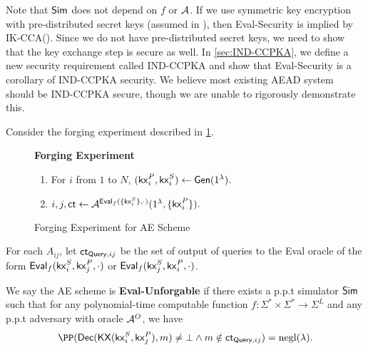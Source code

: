 Note that $\mathsf{Sim}$ does not depend on $f$ or $\mathcal{A}$. If we use symmetric key encryption with pre-distributed secret keys (assumed in \cite{angel2016unobservable}), then Eval-Security is implied by IK-CCA(\cite[Definition 1]{BBDP01keyprivate}). Since we do not have pre-distributed secret keys, we need to show that the key exchange step is secure as well. In \cref{sec:IND-CCPKA}, we define a new security requirement called IND-CCPKA  and show that Eval-Security is a corollary of IND-CCPKA security. We believe most existing AEAD system should be IND-CCPKA secure, though we are unable to rigorously demonstrate this.

\begin{definition}
\label{defn:AE-unforgability}
Consider the forging experiment described in \cref{expr:AE-forging}.

\begin{figure}[h!]
\begin{framed}
\textbf{Forging Experiment}
\begin{enumerate}
    \item For $i$ from $1$ to $N$, $(\mathsf{kx}_i^P, \mathsf{kx}_i^S) \leftarrow \mathsf{Gen}(1^{\lambda}).$
    \item $i, j, \mathsf{ct} \leftarrow \mathcal{A}^{\mathsf{Eval}_f(\{\mathsf{kx}_i^S\}, \cdot)}(1^{\lambda}, \{\mathsf{kx}_i^P\}).$
\end{enumerate}
\end{framed}
\caption{Forging Experiment for AE Scheme}
\label{expr:AE-forging}
\end{figure}

For each $A_{ij}$, let $\mathsf{ct}_{\mathsf{Query}, ij}$ be the set of output of queries to the Eval oracle of the form $\mathsf{Eval}_f(\mathsf{kx}_i^S, \mathsf{kx}_j^P, \cdot)$ or $\mathsf{Eval}_f(\mathsf{kx}_j^S, \mathsf{kx}_i^P, \cdot)$.

We say the AE scheme is \textbf{Eval-Unforgable} if there exists a p.p.t simulator $\mathsf{Sim}$ such that for any polynomial-time computable function $f: \Sigma^* \times \Sigma^* \to \Sigma^{L}$ and any p.p.t adversary with oracle $\mathcal{A}^O$, we have
$$\PP(\dec(\KX(\kx_i^S, \kx_j^P), m) \neq \bot \land m \notin \ct_{\query, ij}) = \negl(\lambda).$$
\end{definition}

